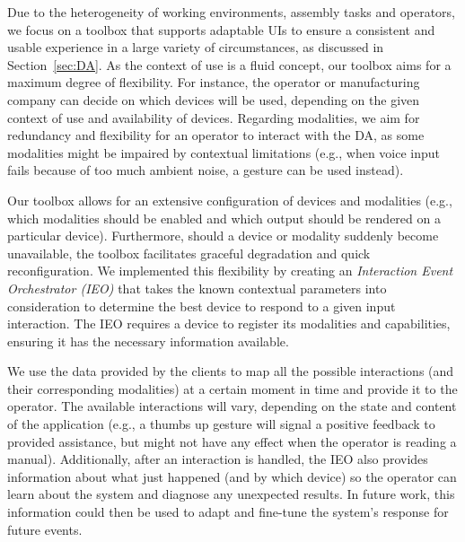 Due to the heterogeneity of working environments, assembly tasks and operators, we focus on a toolbox that supports adaptable UIs to ensure a consistent and usable experience in a large variety of circumstances, as discussed in Section~\ref{sec:DA}. As the context of use is a fluid concept, our toolbox aims for a maximum degree of flexibility. For instance, the operator or manufacturing company can decide on which devices will be used, depending on the given context of use and availability of devices. Regarding modalities, we aim for redundancy and flexibility for an operator to interact with the DA, as some modalities might be impaired by contextual limitations (e.g., when voice input fails because of too much ambient noise, a gesture can be used instead).

Our toolbox allows for an extensive configuration of devices and modalities (e.g., which modalities should be enabled and which output should be rendered on a particular device). Furthermore, should a device or modality suddenly become unavailable, the toolbox facilitates graceful degradation and quick reconfiguration. We implemented this flexibility by creating an \emph{Interaction Event Orchestrator (IEO)} that takes the known contextual parameters into consideration to determine the best device to respond to a given input interaction. The IEO requires a device to register its modalities and capabilities, ensuring it has the necessary information available.

We use the data provided by the clients to map all the possible interactions (and their corresponding modalities) at a certain moment in time and provide it to the operator. The available interactions will vary, depending on the state and content of the application (e.g., a thumbs up gesture will signal a positive feedback to provided assistance, but might not have any effect when the operator is reading a manual). 
Additionally, after an interaction is handled, the IEO also provides information about what just happened (and by which device) so the operator can learn about the system and diagnose any unexpected results. In future work, this information could then be used to adapt and fine-tune the system's response for future events.

